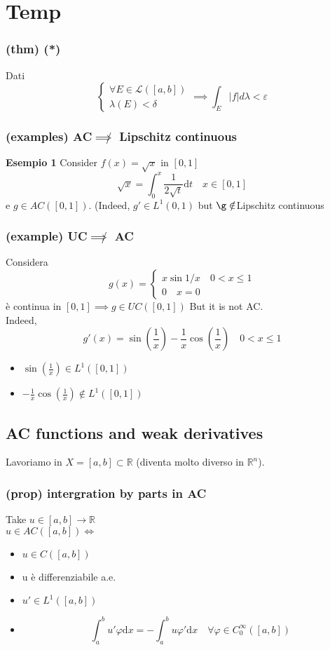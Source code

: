 \section{Temp}
\subsubsection{(thm) (*)}
Dati
$$\begin{cases}\forall E \in \mathcal L([a,b])\\\lambda(E)<\delta\end{cases} \implies \int_E |f| d\lambda <\varepsilon$$

\subsubsection{(examples) AC$\not\implies$ Lipschitz continuous}
\textbf{Esempio 1}
Consider $f(x)=\sqrt x $ in $[0,1]$
$$\sqrt x = \int _0^x \frac 1{2\sqrt t }\mathrm dt\quad x\in [0,1]$$
e $g\in AC([0,1])$. (Indeed, $g'\in L^1(0,1)$
but $\g\notin $Lipschitz continuous\\
\subsubsection{(example) UC$\not\implies$ AC}
Considera $$g(x)=\begin{cases}x \sin{1/x}\quad 0<x\leq 1\\0\quad x=0\end{cases}$$
è continua in $[0,1]\implies g\in UC([0,1])$
But it is not AC.\\
Indeed,
$$ g'(x)=\sin (\frac 1x)-\frac 1x \cos(\frac 1x)\quad 0<x\leq 1$$
\begin{itemize}
    \item $\sin (\frac 1x)\in L^1([0,1])$
    \item $-\frac 1x \cos(\frac 1x) \notin L^1([0,1])$
\end{itemize}

\subsection{AC functions and weak derivatives}
Lavoriamo in $X=[a,b]\subset \mathbb R$ (diventa molto diverso in $\mathbb R^n$).
\subsubsection{(prop) intergration by parts in AC}
Take $u\in [a,b]\to \mathbb R$\\
$u\in AC([a,b])\iff$
\begin{itemize}
    \item $u \in C([a,b])$
    \item u è differenziabile a.e.
    \item $u'\in L^1([a,b])$
    \item $$\int_a^b u'\varphi \mathrm d x = -\int_a^b u\varphi'\mathrm d x\quad \forall \varphi \in C_0^\infty([a,b])$$
\end{itemize}
